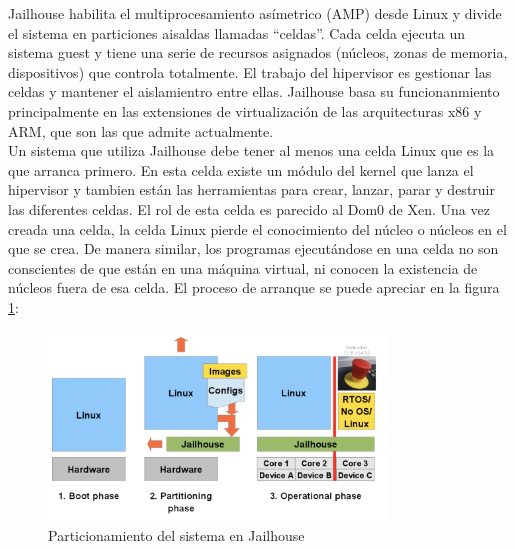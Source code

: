 Jailhouse habilita el multiprocesamiento asímetrico (\acrshort{AMP}) desde Linux y divide el sistema en particiones aisaldas llamadas ``celdas''. Cada celda ejecuta un sistema guest y tiene una serie de recursos asignados (núcleos, zonas de memoria, dispositivos) que controla totalmente. El trabajo del hipervisor es gestionar las celdas y mantener el aislamientro entre ellas. Jailhouse basa su funcionanmiento principalmente en las extensiones de virtualización de las arquitecturas x86 y ARM, que son las que admite actualmente.\\
Un sistema que utiliza Jailhouse debe tener al menos una celda Linux que es la que arranca primero. En esta celda existe un módulo del kernel que lanza el hipervisor y tambien están las herramientas para crear, lanzar, parar y destruir las diferentes celdas. El rol de esta celda es parecido al Dom0 de Xen. Una vez creada una celda, la celda Linux pierde el conocimiento del núcleo o núcleos en el que se crea. De manera similar, los programas ejecutándose en una celda no son conscientes de que están en una máquina virtual, ni conocen la existencia de núcleos fuera de esa celda. El proceso de arranque se puede apreciar en la figura \ref{fig:jail_2}:\\

\begin{figure}[h]
  \centering
  \includegraphics[width=0.80\textwidth]{recursos/jailhouse_2.png}
  \caption{Particionamiento del sistema en Jailhouse}
  \label{fig:jail_2}
\end{figure}
